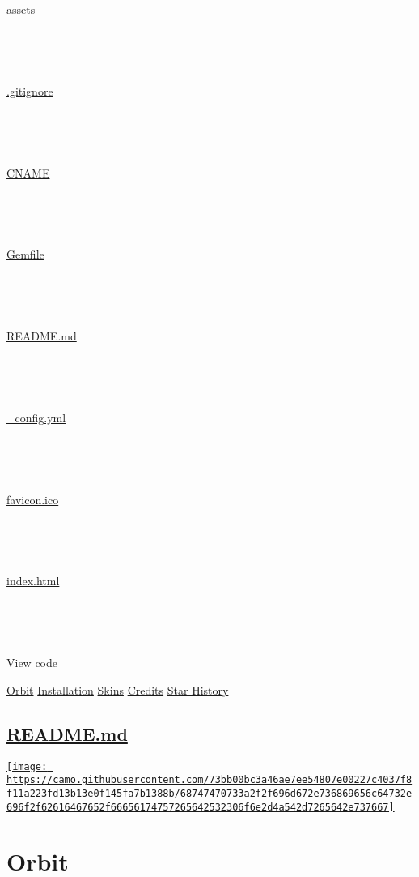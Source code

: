 \documentclass[
  english,
]{article}
\begin{document}
{\href{/CptMike/online-cv/tree/master/assets}{assets}}

~

~

{\href{/CptMike/online-cv/blob/master/.gitignore}{.gitignore}}

~

~

{\href{/CptMike/online-cv/blob/master/CNAME}{CNAME}}

~

~

{\href{/CptMike/online-cv/blob/master/Gemfile}{Gemfile}}

~

~

{\href{/CptMike/online-cv/blob/master/README.md}{README.md}}

~

~

{\href{/CptMike/online-cv/blob/master/_config.yml}{\_config.yml}}

~

~

{\href{/CptMike/online-cv/blob/master/favicon.ico}{favicon.ico}}

~

~

{\href{/CptMike/online-cv/blob/master/index.html}{index.html}}

~

~

View code

\hypertarget{readme}{}
\protect\hyperlink{orbit}{Orbit}
\protect\hyperlink{installation}{Installation}
\protect\hyperlink{skins}{Skins} \protect\hyperlink{credits}{Credits}
\protect\hyperlink{star-history}{Star History}

\hypertarget{readme.md}{%
\subsection{\texorpdfstring{\protect\hyperlink{readme}{README.md}}{README.md}}\label{readme.md}}

\href{https://jekyll-themes.com}{\texttt{[image: https://camo.githubusercontent.com/73bb00bc3a46ae7ee54807e00227c4037f8f11a223fd13b13e0f145fa7b1388b/68747470733a2f2f696d672e736869656c64732e696f2f62616467652f66656174757265642532306f6e2d4a542d7265642e737667]}}

\hypertarget{orbit}{%
\section[Orbit]{\texorpdfstring{\protect\hypertarget{user-content-orbit}{\protect\hyperlink{orbit}{}}Orbit}{Orbit}}\label{orbit}}
\end{document}
